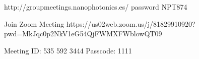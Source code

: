 http://groupmeetings.nanophotonics.es/  password NPT874


Join Zoom Meeting
https://us02web.zoom.us/j/81829910920?pwd=MkJqc0p2NkV1eG54QjFWMXFWblowQT09

Meeting ID: 535 592 3444
Passcode: 1111



